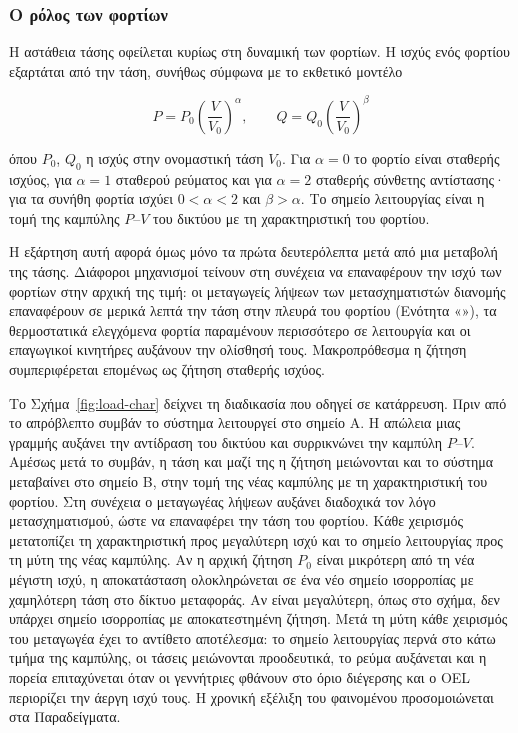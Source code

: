\subsubsection{Ο ρόλος των φορτίων}
\label{sec:load-role}

Η αστάθεια τάσης οφείλεται κυρίως στη δυναμική των φορτίων. Η ισχύς ενός φορτίου εξαρτάται
από την τάση, συνήθως σύμφωνα με το εκθετικό μοντέλο

\begin{equation}
P = P_0 \left(\frac{V}{V_0}\right)^{\alpha}, \qquad
Q = Q_0 \left(\frac{V}{V_0}\right)^{\beta}
\label{eq:loadexp}
\end{equation}

όπου $P_0$, $Q_0$ η ισχύς στην ονομαστική τάση $V_0$. Για $\alpha = 0$ το φορτίο είναι σταθερής
ισχύος, για $\alpha = 1$ σταθερού ρεύματος και για $\alpha = 2$ σταθερής σύνθετης αντίστασης·
για τα συνήθη φορτία ισχύει $0 < \alpha < 2$ και $\beta > \alpha$. Το σημείο λειτουργίας είναι
η τομή της καμπύλης $P$--$V$ του δικτύου με τη χαρακτηριστική του φορτίου.

Η εξάρτηση αυτή αφορά όμως μόνο τα πρώτα δευτερόλεπτα μετά από μια μεταβολή της τάσης.
Διάφοροι μηχανισμοί τείνουν στη συνέχεια να επαναφέρουν την ισχύ των φορτίων στην αρχική της
τιμή: οι μεταγωγείς λήψεων των μετασχηματιστών διανομής επαναφέρουν σε μερικά λεπτά την τάση
στην πλευρά του φορτίου (Ενότητα «»), τα θερμοστατικά ελεγχόμενα φορτία
παραμένουν περισσότερο σε λειτουργία και οι επαγωγικοί κινητήρες αυξάνουν την ολίσθησή τους.
Μακροπρόθεσμα η ζήτηση συμπεριφέρεται επομένως ως ζήτηση σταθερής ισχύος.

Το Σχήμα~\ref{fig:load-char} δείχνει τη διαδικασία που οδηγεί σε κατάρρευση. Πριν από το
απρόβλεπτο συμβάν το σύστημα λειτουργεί στο σημείο A. Η απώλεια μιας γραμμής αυξάνει την
αντίδραση του δικτύου και συρρικνώνει την καμπύλη $P$--$V$. Αμέσως μετά το συμβάν, η τάση και
μαζί της η ζήτηση μειώνονται και το σύστημα μεταβαίνει στο σημείο B, στην τομή της νέας καμπύλης
με τη χαρακτηριστική του φορτίου. Στη συνέχεια ο μεταγωγέας λήψεων αυξάνει διαδοχικά τον λόγο
μετασχηματισμού, ώστε να επαναφέρει την τάση του φορτίου. Κάθε χειρισμός μετατοπίζει τη
χαρακτηριστική προς μεγαλύτερη ισχύ και το σημείο λειτουργίας προς τη μύτη της νέας καμπύλης.
Αν η αρχική ζήτηση $P_0$ είναι μικρότερη από τη νέα μέγιστη ισχύ, η αποκατάσταση ολοκληρώνεται
σε ένα νέο σημείο ισορροπίας με χαμηλότερη τάση στο δίκτυο μεταφοράς. Αν είναι μεγαλύτερη,
όπως στο σχήμα, δεν υπάρχει σημείο ισορροπίας με αποκατεστημένη ζήτηση. Μετά τη μύτη κάθε
χειρισμός του μεταγωγέα έχει το αντίθετο αποτέλεσμα: το σημείο λειτουργίας περνά στο κάτω τμήμα
της καμπύλης, οι τάσεις μειώνονται προοδευτικά, το ρεύμα αυξάνεται και η πορεία επιταχύνεται
όταν οι γεννήτριες φθάνουν στο όριο διέγερσης και ο OEL περιορίζει την άεργη ισχύ τους. Η
χρονική εξέλιξη του φαινομένου προσομοιώνεται στα Παραδείγματα.

